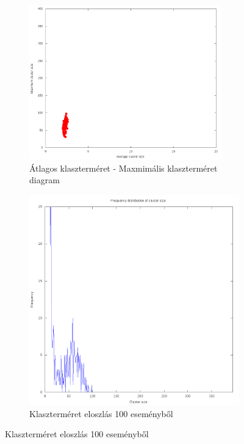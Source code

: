 \documentclass[a4paper,12pt]{article}
\begin{document}
\begin{figure}[H]
	\centering
	\begin{subfigure}{.49\textwidth}
		\includegraphics[width=0.92\textwidth]{mean-max14_120.png}
		\caption{ Átlagos klaszterméret - Maxmimális klaszterméret diagram }
	\end{subfigure}
	\begin{subfigure}{.49\textwidth}
		\includegraphics[width=.92\textwidth]{distribution_zoomed_14_120.png}
		\caption{ Klaszterméret eloszlás 100 eseményből } 
	\end{subfigure}
\end{figure}
\end{document}
